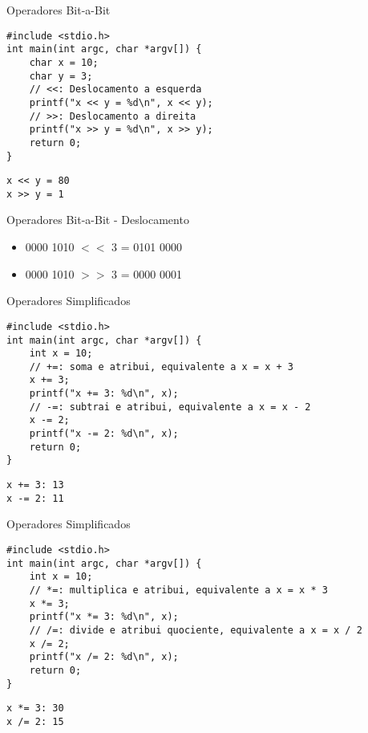 \documentclass[t, aspectratio=169]{beamer}
\begin{document}
\begin{frame}[label={sec:org457b7a7},fragile]{Operadores Bit-a-Bit}
 \vspace{-0.5cm}
\begin{verbatim}
#include <stdio.h>
int main(int argc, char *argv[]) {
    char x = 10;
    char y = 3;
    // <<: Deslocamento a esquerda
    printf("x << y = %d\n", x << y);
    // >>: Deslocamento a direita
    printf("x >> y = %d\n", x >> y);
    return 0;
}
\end{verbatim}

\begin{verbatim}
x << y = 80
x >> y = 1
\end{verbatim}
\end{frame}

\begin{frame}[label={sec:org239ccf6}]{Operadores Bit-a-Bit - Deslocamento}
\begin{itemize}
\item 0000 1010 \(<<\) 3 = 0101 0000
\item 0000 1010 \(>>\) 3 = 0000 0001
\end{itemize}
\end{frame}

\begin{frame}[label={sec:org23b9016},fragile]{Operadores Simplificados}
 \vspace{-0.5cm}
\begin{verbatim}
#include <stdio.h>
int main(int argc, char *argv[]) {
    int x = 10;
    // +=: soma e atribui, equivalente a x = x + 3
    x += 3;
    printf("x += 3: %d\n", x);
    // -=: subtrai e atribui, equivalente a x = x - 2
    x -= 2;
    printf("x -= 2: %d\n", x);
    return 0;
}
\end{verbatim}

\begin{verbatim}
x += 3: 13
x -= 2: 11
\end{verbatim}
\end{frame}

\begin{frame}[label={sec:orgf461c1d},fragile]{Operadores Simplificados}
 \vspace{-0.5cm}
\begin{verbatim}
#include <stdio.h>
int main(int argc, char *argv[]) {
    int x = 10;
    // *=: multiplica e atribui, equivalente a x = x * 3
    x *= 3;
    printf("x *= 3: %d\n", x);
    // /=: divide e atribui quociente, equivalente a x = x / 2
    x /= 2;
    printf("x /= 2: %d\n", x);
    return 0;
}
\end{verbatim}

\begin{verbatim}
x *= 3: 30
x /= 2: 15
\end{verbatim}
\end{frame}
\end{document}
